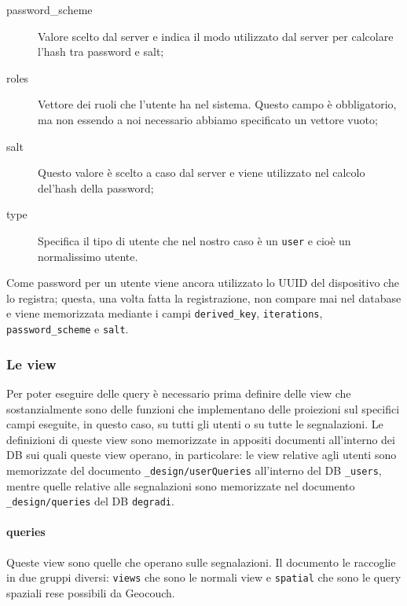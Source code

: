 \begin{description}
                    \item[password\_scheme] Valore scelto dal server e indica 
                    il modo utilizzato dal server per calcolare l'hash tra 
                    password e salt;
                    \item[roles] Vettore dei ruoli che l'utente ha nel 
                    sistema. Questo campo è obbligatorio, ma non essendo a noi
                    necessario abbiamo specificato un vettore vuoto;
                    \item[salt] Questo valore è scelto a caso dal server e 
                    viene utilizzato nel calcolo del'hash della password;
                    \item[type] Specifica il tipo di utente che nel nostro 
                    caso è un \texttt{user} e cioè un normalissimo utente. 
                \end{description}
                Come password per un utente viene ancora utilizzato lo UUID 
                del dispositivo che lo registra; questa, una volta fatta la 
                registrazione, non compare mai nel database e viene 
                memorizzata mediante i campi \texttt{derived\_key}, 
                \texttt{iterations}, \texttt{password\_scheme} e \texttt{salt}.
                
            \subsubsection{Le view}
                Per poter eseguire delle query è necessario prima definire 
                delle view che sostanzialmente sono delle funzioni che 
                implementano delle proiezioni sul specifici campi eseguite, in 
                questo caso, su tutti gli utenti o su tutte le segnalazioni.
                Le definizioni di queste view sono memorizzate in appositi 
                documenti all'interno dei DB sui quali queste view operano, in 
                particolare: le view relative agli utenti sono memorizzate del 
                documento \texttt{\_design/userQueries} all'interno del DB 
                \texttt{\_users}, mentre quelle relative alle segnalazioni 
                sono memorizzate nel documento \texttt{\_design/queries} del 
                DB \texttt{degradi}.
                
                \paragraph{queries} Queste view sono quelle che operano sulle 
                segnalazioni. Il documento le raccoglie in due gruppi diversi: 
                \texttt{views} che sono le normali view e \texttt{spatial} che 
                sono le query spaziali rese possibili da Geocouch.
                
